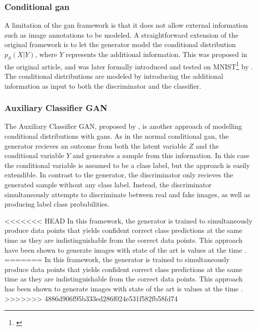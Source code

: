 \subsubsection{Conditional \acrshort{gan}}
A limitation of the \acrshort{gan} framework is that it does not allow external information such as image annotations to be modeled. A straightforward extension of the original framework is to let the generator model the conditional distribution $p_S(X|Y)$, where $Y$ represents the additional information. This was proposed in the original article, and was later formally introduced and tested on MNIST\footnote{\textcite{lecun2010mnist}} by \textcite{mirza2014conditional}. The conditional distributions are modeled by introducing the additional information as input to both the discriminator and the classifier.


\subsubsection{Auxiliary Classifier GAN}
The Auxiliary Classifier GAN, proposed by \textcite{odena2016conditional}, is another approach of modelling conditional distributions with \acrshort{gans}. As in the normal conditional \acrshort{gan}, the generator recieves an outcome from both the latent variable $Z$ and the conditional variable $Y$ and generates a sample from this information. In this case the conditional variable is assumed to be a class label, but the approach is easily extendible. In contrast to the generator, the discriminator only recieves the generated sample without any class label. Instead, the discriminator simultaneously attempts to discriminate between real and fake images, as well as producing label class probabilities.

<<<<<<< HEAD
In this framework, the generator is trained to simultaneously produce data points that yields confident correct class predictions at the same time as they are indistinguishable from the correct data points. This approach have been shown to generate images with state of the art \acrlong{is} values at the time \parencite{odena2016conditional}.
=======
In this framework, the generator is trained to simultaneously produce data points that yields confident correct class predictions at the same time as they are indistinguishable from the correct data points. This approach has been shown to generate images with state of the art \acrshort{is} values at the time \parencite{odena2016conditional}.
>>>>>>> 4886d906f95b333ed286f024e531f582fb58fd74

